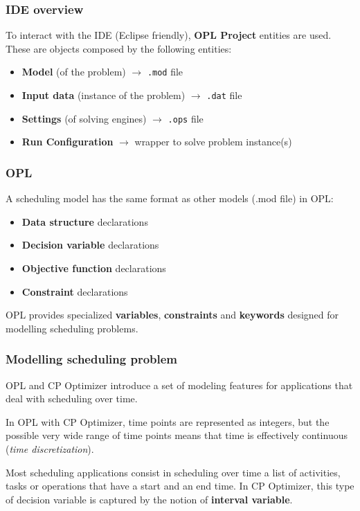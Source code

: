 \begin{frame} \frametitle{IDE overview}
\pause
To interact with the IDE (Eclipse friendly), \textbf{OPL Project} entities are used. These are objects composed by the following entities:\pause

\begin{itemize}[<+->]
	\item \textbf{Model} (of the problem) $\rightarrow$ \texttt{.mod} file
	\item \textbf{Input data} (instance of the problem) $\rightarrow$ \texttt{.dat} file
	\item \textbf{Settings} (of solving engines) $\rightarrow$ \texttt{.ops} file
	\item \textbf{Run Configuration} $\rightarrow$ wrapper to solve problem instance(s)
\end{itemize}

\end{frame}


\begin{frame} \frametitle{OPL}
\pause
A scheduling model has the same format as other models (.mod file) in OPL:\pause

\begin{itemize}[<+->]
	\item \textbf{Data structure} declarations
	\item \textbf{Decision variable} declarations 
	\item \textbf{Objective function} declarations
	\item \textbf{Constraint} declarations
\end{itemize}

\pause \medskip

OPL provides specialized \textbf{variables}, \textbf{constraints} and \textbf{keywords} designed for modelling scheduling problems.

\end{frame}


\begin{frame} \frametitle{Modelling scheduling problem}
\pause
OPL and CP Optimizer introduce a set of modeling features for applications that deal with scheduling over time.

\pause\medskip

In OPL with CP Optimizer, time points are represented as integers, but the possible very wide range of time points means that time is effectively continuous (\emph{time discretization}).

\pause\medskip

Most scheduling applications consist in scheduling over time a list of activities, tasks or operations that have a start and an end time. In CP Optimizer, this type of decision variable is captured by the notion of \textbf{interval variable}. 

\end{frame}


